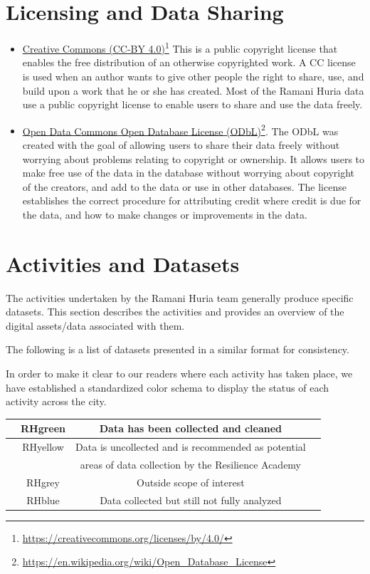 \documentclass[a4paper,12pt,twoside]{article}
\begin{document}
\section{Licensing and Data Sharing}
\begin{itemize}
    \item
    \href{https://creativecommons.org/licenses/by/4.0/}{Creative Commons (CC-BY 4.0)}\footnote{\url{https://creativecommons.org/licenses/by/4.0/}}
This is a public copyright license that enables the free distribution of an otherwise copyrighted work. A CC license is used when an author wants to give other people the right to share, use, and build upon a work that he or she has created. Most of the Ramani Huria data use a public copyright license to enable users to share and use the data freely.

\item 
\href{https://en.wikipedia.org/wiki/Open_Database_License}{Open Data Commons Open Database License (ODbL)}\footnote{\url{https://en.wikipedia.org/wiki/Open_Database_License}}.
The ODbL was created with the goal of allowing users to share their data freely without worrying about problems relating to copyright or ownership. It allows users to make free use of the data in the database without worrying about copyright of the creators, and add to the data or use in other databases. The license establishes the correct procedure for attributing credit where credit is due for the data, and how to make changes or improvements in the data. 

\end{itemize}

\newpage
\section{Activities and Datasets}
The activities undertaken by the Ramani Huria team generally produce specific datasets. This section describes the activities and provides an overview of the digital assets/data associated with them.

The following is a list of datasets presented in a similar format for consistency.

In order to make it clear to our readers where each activity has taken place, we have established a standardized color schema to display the status of each activity across the city. 

\begin{tabular}{|c|c|c|c|}
\hline
{\colorbox{RHgreen}{   }} & RHgreen & Data has been collected and cleaned\\
\hline
{\colorbox{RHyellow}{   }} & RHyellow & Data is uncollected and is recommended as potential\\
{} & {} & areas of data collection by the Resilience Academy\\
\hline
{\colorbox{RHgrey}{   }} & RHgrey & Outside scope of interest\\
\hline
{\colorbox{RHblue}{   }} & RHblue & Data collected but still not fully analyzed\\
\hline
\end{tabular}
\end{document}
